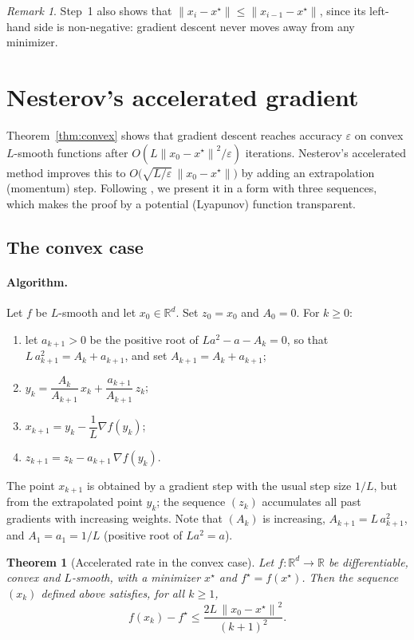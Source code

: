 \documentclass[11pt,a4paper]{article}
\newtheorem{theorem}{Theorem}
\theoremstyle{definition}
\theoremstyle{remark}
\newtheorem{remark}{Remark}
\newcommand{\R}{\mathbb{R}}
\newcommand{\norm}[1]{\left\lVert #1 \right\rVert}
\begin{document}
\begin{remark}
Step~1 also shows that $\norm{x_i - x^\star} \le \norm{x_{i-1} - x^\star}$, since its left-hand side is non-negative: gradient descent never moves away from any minimizer.
\end{remark}

\section{Nesterov's accelerated gradient}\label{sec:nesterov}

Theorem~\ref{thm:convex} shows that gradient descent reaches accuracy $\varepsilon$ on convex $L$-smooth functions after $O(L\norm{x_0 - x^\star}^2/\varepsilon)$ iterations. Nesterov's accelerated method improves this to $O\big(\sqrt{L/\varepsilon}\,\norm{x_0 - x^\star}\big)$ by adding an extrapolation (momentum) step. Following \cite{daspremont}, we present it in a form with three sequences, which makes the proof by a potential (Lyapunov) function transparent.

\subsection{The convex case}\label{sec:nesterov-convex}

\paragraph{Algorithm.}
Let $f$ be $L$-smooth and let $x_0 \in \R^d$. Set $z_0 = x_0$ and $A_0 = 0$. For $k \ge 0$:
\begin{enumerate}
\item let $a_{k+1} > 0$ be the positive root of $L a^2 - a - A_k = 0$, so that $L\,a_{k+1}^2 = A_k + a_{k+1}$, and set $A_{k+1} = A_k + a_{k+1}$;
\item $y_k = \dfrac{A_k}{A_{k+1}}\, x_k + \dfrac{a_{k+1}}{A_{k+1}}\, z_k$;
\item $x_{k+1} = y_k - \dfrac1L \nabla f(y_k)$;
\item $z_{k+1} = z_k - a_{k+1}\, \nabla f(y_k)$.
\end{enumerate}
The point $x_{k+1}$ is obtained by a gradient step with the usual step size $1/L$, but from the extrapolated point $y_k$; the sequence $(z_k)$ accumulates all past gradients with increasing weights. Note that $(A_k)$ is increasing, $A_{k+1} = L\,a_{k+1}^2$, and $A_1 = a_1 = 1/L$ (positive root of $L a^2 = a$).

\begin{theorem}[Accelerated rate in the convex case]\label{thm:nesterov}
Let $f : \R^d \to \R$ be differentiable, convex and $L$-smooth, with a minimizer $x^\star$ and $f^\star = f(x^\star)$. Then the sequence $(x_k)$ defined above satisfies, for all $k \ge 1$,
\[
f(x_k) - f^\star \le \frac{2L\,\norm{x_0 - x^\star}^2}{(k+1)^2} .
\]
\end{theorem}
\end{document}
